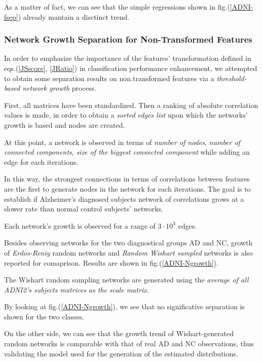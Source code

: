 \documentclass[12pt,openright,twoside,a4paper]{book}
\begin{document}
As a matter of fact, we can see that the simple regressions shown in fig.(\ref{ADNI-fsep}) already mantain a disctinct trend.

\subsubsection*{Network Growth Separation for Non-Transformed Features}

In order to emphasize the importance of the features' transformation defined in eqs.(\ref{JSscore}, \ref{JRatio}) in classification performance enhancement, we attempted to obtain some separation results on non.transformed features via a \textit{threshold-based network growth} process.
\vspace{5mm}

First, all matrices have been standardized. Then a ranking of absolute correlation values is made, in order to obtain a \textit{sorted edges list} upon which the networks' growth is based and nodes are created.

At this point, a network is observed in terms of \textit{number of nodes}, \textit{number of connected components}, \textit{size of the biggest connected component} while adding an edge for each iterations. 

In this way, the strongest connections in terms of correlations between features are the first to generate nodes in the network for each iterations. The goal is to establish if Alzheimer's diagnosed subjects network of correlations grows at a slower rate than normal control subjects' networks.

Each network's growth is observed for a range of $3\cdot 10^3$ edges.

Besides observing networks for the two diagnostical groups AD and NC,  growth of \textit{Erdos-Reniy} random networks and \textit{Random Wishart sampled} networks is also reported for comaprison. Results are shown in fig.(\ref{ADNI-Ngrowth}).

The Wishart random sampling networks are generated using the \textit{average of all ADNI2's subjects matrices as the scale matrix}.
\vspace{5mm}

By looking at fig.(\ref{ADNI-Ngrowth}), we see that no significative separation is shown for the two classes.

On the other side, we can see that the growth trend of Wishart-generated random networks is comparable with that of real AD and NC observations, thus validating the model used for the generation of the estimated distributions.
\end{document}
